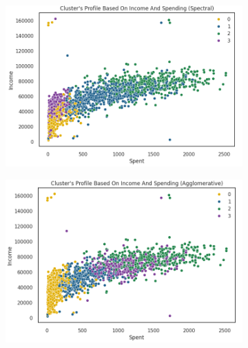 \documentclass[11pt]{article}
\begin{document}
\vspace{1\baselineskip}
\begin{figure}[H]
\centering
\begin{subfigure}[b]{0.45\textwidth}
\centering
\includegraphics[width=\textwidth]{./images/image14.png}
\end{subfigure}
\hfill
\begin{subfigure}[b]{0.45\textwidth}
\centering
\includegraphics[width=\textwidth]{./images/image5.png}
\end{subfigure}
\end{figure}
\end{document}
